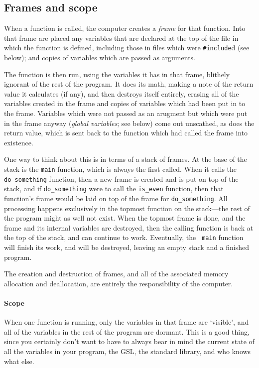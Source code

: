 \documentclass[12pt]{article}
\begin{document}
\subsection{Frames and scope}  
When a function is called, the computer creates a
{\sl frame} for that function. Into that frame are placed any variables
that are declared at the top of the file in which the function is defined,
including those in files which were {\tt \#include}d (see below); and copies of
variables which are passed as arguments. 

The function is then run, using the variables it has in that frame,
blithely ignorant of the rest of the program. It does its math, making a
note of the return value it calculates (if any), and then destroys itself
entirely, erasing all of the variables created in the frame and copies
of variables which had been put in to the frame. Variables which were not
passed as an arugment but which were put in the frame anyway ({\sl global
variables}; see below) come out unscathed, as does the return value, which
is sent back to the function which had called the frame into existence.

One way to think about this is in terms of a stack of frames. At the
base of the stack is the {\tt main} function, which is always the first
called. When it calls the {\tt do\_something} function, then a new frame
is created and is put on top of the stack, and if {\tt do\_something}
were to call the {\tt is\_even} function, then that function's frame would be laid on top
of the frame for {\tt do\_something}. All processing happens exclusively in
the topmost function on the stack---the rest of the program might as
well not exist. When the topmost frame is done, and the frame and its
internal variables are destroyed, then the calling function is back at
the top of the stack, and can continue to work. Eventually, the {\tt
main} function will finish its work, and will be destroyed, leaving an
empty stack and a finished program.

The creation and destruction of frames, and all of the associated
memory allocation and deallocation, are entirely the responsibility of
the computer.   

\paragraph{Scope}	\label{scope}

When one function is running, only the variables in that frame are
`visible', and all of the variables in the rest of the program are 
dormant.  This is a good thing, since you certainly don't want to have
to always bear in mind the current state of  all the variables in your program,
the GSL, the standard library, and who knows what else.
\end{document}
